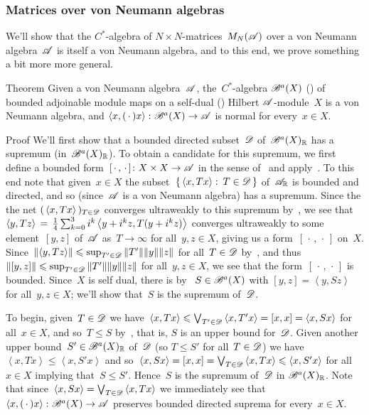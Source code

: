 \documentclass[a]{subfiles}
\begin{document}
\subsubsection{Matrices over von Neumann algebras} 
\begin{parsec}%
\begin{point}%
We'll show that the $C^*$-algebra
of $N\times N$-matrices~$M_N(\mathscr{A})$
over a von Neumann algebra~$\mathscr{A}$
is itself a von Neumann algebra,
and to this end,
we prove something a bit more more general.
\end{point}
\begin{point}[bah-vn]{Theorem}%
Given a von Neumann algebra~$\mathscr{A}$,
the~$C^*$-algebra $\mathscr{B}^a(X)$ ()
of bounded adjoinable module maps on
a self-dual () Hilbert $\mathscr{A}$-module~$X$
is a  von Neumann algebra,
and
$\left<x,(\,\cdot\,)x\right>\colon \mathscr{B}^a(X)\to\mathscr{A}$
is normal for every~$x\in X$.
\begin{point}{Proof}%
We'll first show that
a  bounded directed subset~$\mathscr{D}$ of~$\mathscr{B}^a(X)_{\mathbb{R}}$
has a supremum (in~$\mathscr{B}^a(X)_{\mathbb{R}}$).
To obtain a candidate for this supremum,
we first define
a bounded form~$[\,\cdot\,,\,\cdot\,]\colon X\times X\to\mathscr{A}$
in the sense of~
and apply~.
To this end note that given~$x\in X$
the subset~$\{\,\left<x,Tx\right>\colon \, T\in\mathscr{D}\,\}$
of~$\mathscr{A}_{\mathbb{R}}$
is bounded and directed,
and so 
(since~$\mathscr{A}$ is a von Neumann algebra)
has a supremum.
Since the 
the net $(\,\left<x,Tx\right>\,)_{T\in \mathscr{D}}$
converges ultraweakly to this supremum
by~,
we see that
$\left<y,Tz\right>\,= \,\frac{1}{4}
\sum_{k=0}^3
i^k\left<y+i^kz,\smash{T(y+i^kz)}\right>$
converges ultraweakly to 
some element~$[y,z]$ of~$\mathscr{A}$
as~$T\to\infty$ for all~$y,z\in X$,
giving us a form~$[\,\cdot\,,\,\cdot\,]$ on~$X$.
Since~$\left\|\left<y,T z \right>\right\|
\leqslant \sup_{T'\in \mathscr{D}} \|T'\| \|y\|\|z\|$
for all~$T\in\mathscr{D}$
by~,
and thus~$\|[y,z]\|\leqslant \sup_{T'\in\mathscr{D}} \|T'\|\|y\|\|z\|$
for all~$y,z\in X$,
we see that the form~$[\,\cdot\,,\,\cdot\,]$
is bounded.
Since~$X$ is self dual,
there is
by~
$S\in \mathscr{B}^a(X)$
with
$[y,z]=\left<y,Sz\right>$
for all~$y,z\in X$;
we'll show that~$S$ is the supremum of~$\mathscr{D}$.

To begin,
given~$T\in\mathscr{D}$
we have~$\left<x,Tx\right>\leqslant\bigvee_{T'\in\mathscr{D}} \left<x,T'x\right>
=[x,x]=\left<x,Sx\right>$
for all~$x\in X$,
and so~$T\leq S$
by~,
that is, $S$ is an upper bound for~$\mathscr{D}$.
Given another upper bound~$S'\in\mathscr{B}^a(X)_{\mathbb{R}}$
of~$\mathscr{D}$
(so  $T\leq S'$ for all~$T\in\mathscr{D}$)
we have~$\left<x,Tx\right>\leq \left<x,S'x\right>$
and so~$\left<x,Sx\right>
=[x,x]=\bigvee_{T\in \mathscr{D}}\left<x,Tx\right>\leqslant \left<x,S'x\right>$
for all~$x\in X$
implying that~$S\leq S'$.
Hence~$S$ is the supremum of~$\mathscr{D}$
in $\mathscr{B}^a(X)_{\mathbb{R}}$.
Note that since~$\left<x,Sx\right>=\bigvee_{T\in\mathscr{D}} \left<x,Tx\right>$
we immediately see
that $\left<x,(\,\cdot\,)x\right>\colon \mathscr{B}^a(X)\to\mathscr{A}$
preserves bounded directed suprema
for every~$x\in X$.


\end{point}
\end{point}
\end{parsec}
\end{document}
